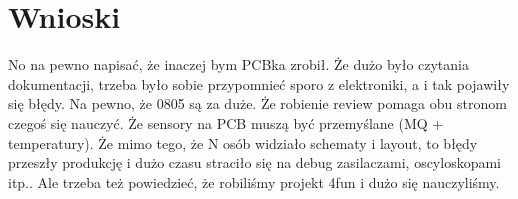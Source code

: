 \chapter{Wnioski}
\label{cha:results}
No na pewno napisać, że inaczej bym PCBka zrobił. Że dużo było czytania dokumentacji, trzeba było sobie przypomnieć sporo z elektroniki, a i tak pojawiły się błędy. Na pewno, że 0805 są za duże. Że robienie review pomaga obu stronom czegoś się nauczyć. Że sensory na PCB muszą być przemyślane (MQ + temperatury). Że mimo tego, że N osób widziało schematy i layout, to błędy przeszły produkcję i dużo czasu straciło się na debug zasilaczami, oscyloskopami itp.. Ale trzeba też powiedzieć, że robiliśmy projekt 4fun i dużo się nauczyliśmy.